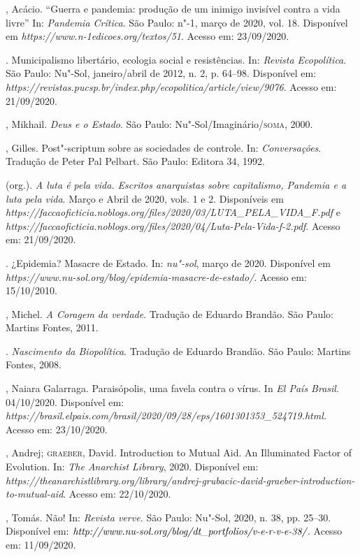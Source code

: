 \begin{bibliohedra}
, Acácio. ``Guerra e pandemia: produção de um inimigo invisível
contra a vida livre'' In: \emph{Pandemia Crítica}. São Paulo: n"-1, março
de 2020, vol. 18. Disponível em
\emph{https://www.n-1edicoes.org/textos/51}. Acesso em: 23/09/2020.

\titidem. Municipalismo libertário, ecologia social e resistências. In:
\emph{Revista Ecopolítica}. São Paulo: Nu"-Sol, janeiro/abril de 2012, n.
2, p. 64--98. Disponível em:
\emph{https://revistas.pucsp.br/index.php/ecopolitica/article/view/9076}.
Acesso em: 21/09/2020.

, Mikhail. \emph{Deus e o Estado}. São Paulo:
Nu"-Sol/Imaginário/\textsc{soma}, 2000.

, Gilles. Post"-scriptum sobre as sociedades de controle. In:
\emph{Conversações}. Tradução de Peter Pal Pelbart. São Paulo: Editora
34, 1992.

 (org.). \emph{A luta é pela vida. Escritos anarquistas
sobre capitalismo, Pandemia e a luta pela vida}. Março e Abril de 2020,
vols. 1 e 2. Disponíveis em
\emph{https://faccaoficticia.noblogs.org/files/2020/03/LUTA\_PELA\_VIDA\_F.pdf}
e
\emph{https://faccaoficticia.noblogs.org/files/2020/04/Luta-Pela-Vida-f-2.pdf}.
Acesso em: 21/09/2020.

. ¿Epidemia? Masacre de Estado. In:
\emph{nu"-sol}, março de 2020. Disponível em
\emph{https://www.nu-sol.org/blog/epidemia-masacre-de-estado/}. Acesso
em: 15/10/2010.

, Michel. \emph{A Coragem da verdade}. Tradução de Eduardo
Brandão. São Paulo: Martins Fontes, 2011.

\titidem. \emph{Nascimento da Biopolítica}. Tradução de Eduardo Brandão.
São Paulo: Martins Fontes, 2008.

, Naiara Galarraga. Paraisópolis, uma favela contra o vírus. In
\emph{El País Brasil}. 04/10/2020. Disponível em:
\emph{https://brasil.elpais.com/brasil/2020/09/28/eps/1601301353\_524719.html.}
Acesso em: 23/10/2020.

, Andrej; \textsc{graeber}, David. Introduction to Mutual Aid. An
Illuminated Factor of Evolution. In: \emph{The Anarchist Library}, 2020.
Disponível em:
\emph{https://theanarchistlibrary.org/library/andrej-grubacic-david-graeber-introduction-to-mutual-aid}.
Acesso em: 22/10/2020.

, Tomás. Não! In: \emph{Revista verve.} São Paulo: Nu"-Sol, 2020,
n. 38, pp. 25--30. Disponível em:
$\emph{http://www.nu-sol.org/blog/dt\_portfolios/v-e-r-v-e-38/}$. Acesso em:
11/09/2020.


\end{bibliohedra}
